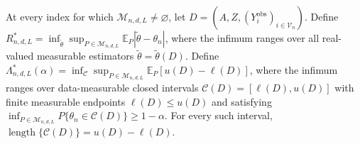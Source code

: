 At every index for which \(\mathcal M_{n,d,L}\ne\varnothing\), let \(D=(A,Z,(Y_i^{\mathrm{obs}})_{i\in\mathcal V_n})\). Define \(R^*_{n,d,L}=\inf_{\widetilde\theta}\sup_{P\in\mathcal M_{n,d,L}}\mathbb E_P|\widetilde\theta-\theta_n|\), where the infimum ranges over all real-valued measurable estimators \(\widetilde\theta=\widetilde\theta(D)\). Define \(\Lambda^*_{n,d,L}(\alpha)=\inf_{\mathcal C}\sup_{P\in\mathcal M_{n,d,L}}\mathbb E_P[u(D)-\ell(D)]\), where the infimum ranges over data-measurable closed intervals \(\mathcal C(D)=[\ell(D),u(D)]\) with finite measurable endpoints \(\ell(D)\leq u(D)\) and satisfying \(\inf_{P\in\mathcal M_{n,d,L}}P\{\theta_n\in\mathcal C(D)\}\geq1-\alpha\). For every such interval, \(\operatorname{length}\{\mathcal C(D)\}=u(D)-\ell(D)\).